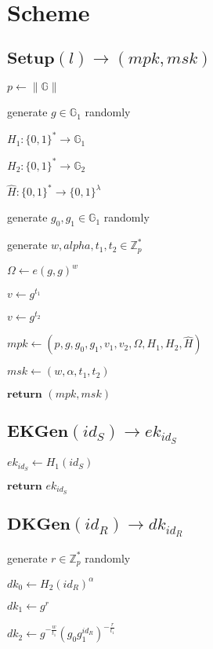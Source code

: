 \documentclass[a4paper]{article}
\begin{document}
\section{Scheme}

\subsection{$\textbf{Setup}(l) \rightarrow (\textit{mpk}, \textit{msk})$}

$p \gets \|\mathbb{G}\|$

generate $g \in \mathbb{G}_1$ randomly

$H_1:\{0, 1\}^* \rightarrow \mathbb{G}_1$

$H_2:\{0, 1\}^* \rightarrow \mathbb{G}_2$

$\hat{H}: \{0, 1\}^* \rightarrow \{0, 1\}^\lambda$

generate $g_0, g_1 \in \mathbb{G}_1$ randomly

generate $w, alpha, t_1, t_2 \in \mathbb{Z}_p^*$

$\Omega \gets e(g, g)^w$

$v \gets g^{t_1}$

$v \gets g^{t_2}$

$\textit{mpk} \gets (p, g, g_0, g_1, v_1, v_2, \Omega, H_1, H_2, \hat{H})$

$\textit{msk} \gets (w, \alpha, t_1, t_2)$

$\textbf{return }(\textit{mpk}, \textit{msk})$

\subsection{$\textbf{EKGen}(\textit{id}_S) \rightarrow \textit{ek}_{\textit{id}_S}$}

$\textit{ek}_{\textit{id}_S} \gets H_1(\textit{id}_S)$

$\textbf{return }\textit{ek}_{\textit{id}_S}$

\subsection{$\textbf{DKGen}(\textit{id}_R) \rightarrow \textit{dk}_{\textit{id}_R}$}

generate $r \in \mathbb{Z}_p^*$ randomly

$\textit{dk}_0 \gets H_2(\textit{id}_R)^\alpha$

$\textit{dk}_1 \gets g^r$

$\textit{dk}_2 \gets g^{-\frac{w}{t_1}}(g_0 g_1^{\textit{id}_R})^{-\frac{r}{t_1}}$
\end{document}
